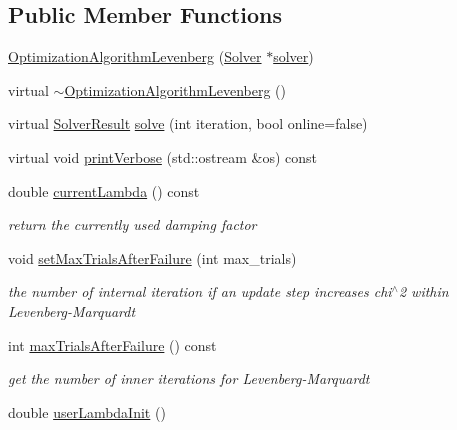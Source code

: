 \subsection*{Public Member Functions}
\begin{DoxyCompactItemize}
\item 
\hyperlink{classg2o_1_1OptimizationAlgorithmLevenberg_aecdac695d6406eb2234bbd8a0c4d53a3}{Optimization\+Algorithm\+Levenberg} (\hyperlink{classg2o_1_1Solver}{Solver} $\ast$\hyperlink{classg2o_1_1OptimizationAlgorithmWithHessian_a85473a4073c76b1a52cf9cf175e31c45}{solver})
\item 
virtual \hyperlink{classg2o_1_1OptimizationAlgorithmLevenberg_a926c821217c53b10fec9275b6fa5e548}{$\sim$\+Optimization\+Algorithm\+Levenberg} ()
\item 
virtual \hyperlink{classg2o_1_1OptimizationAlgorithm_a705d58d7bc19528a8ab718570d090cdf}{Solver\+Result} \hyperlink{classg2o_1_1OptimizationAlgorithmLevenberg_a7140fa989b54eac4e09ba17829dcada0}{solve} (int iteration, bool online=false)
\item 
virtual void \hyperlink{classg2o_1_1OptimizationAlgorithmLevenberg_aed32286a2e441240f34dd5d1dbcd6d56}{print\+Verbose} (std\+::ostream \&os) const 
\item 
double \hyperlink{classg2o_1_1OptimizationAlgorithmLevenberg_aa1b7ffe63dbeae410128c5cc6c95a7ab}{current\+Lambda} () const 
\begin{DoxyCompactList}\small\item\em return the currently used damping factor \end{DoxyCompactList}\item 
void \hyperlink{classg2o_1_1OptimizationAlgorithmLevenberg_a0fd2212e456428e44ddac693f6d27ac8}{set\+Max\+Trials\+After\+Failure} (int max\+\_\+trials)
\begin{DoxyCompactList}\small\item\em the number of internal iteration if an update step increases chi$^\wedge$2 within Levenberg-\/\+Marquardt \end{DoxyCompactList}\item 
int \hyperlink{classg2o_1_1OptimizationAlgorithmLevenberg_a76d1c53e6a7e9061c1a8f59f96726e82}{max\+Trials\+After\+Failure} () const 
\begin{DoxyCompactList}\small\item\em get the number of inner iterations for Levenberg-\/\+Marquardt \end{DoxyCompactList}\item 
double \hyperlink{classg2o_1_1OptimizationAlgorithmLevenberg_a4a4d18c98361a1288db724136d353596}{user\+Lambda\+Init} ()

\end{DoxyCompactItemize}
